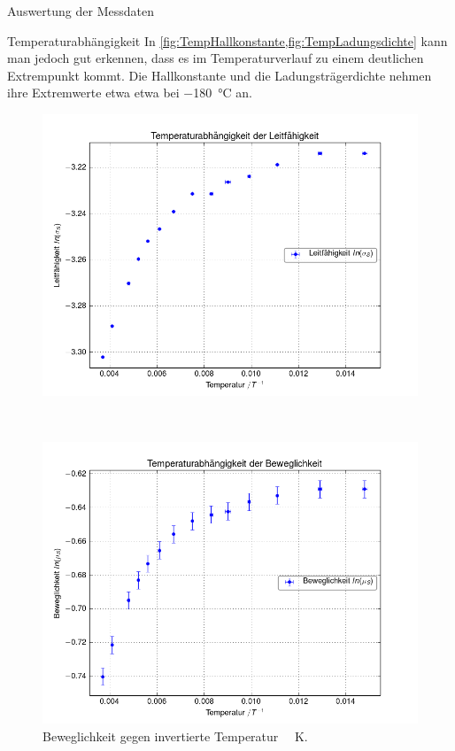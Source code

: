 \documentclass[pdftex, a4paper,11pt, twoside, ngerman]{report}
\begin{document}
\begin{chapter}{Auswertung der Messdaten}
\begin{section}{Temperaturabhängigkeit}
      In \cref{fig:TempHallkonstante,fig:TempLadungsdichte} kann man jedoch gut
      erkennen, dass es im Temperaturverlauf zu einem deutlichen Extrempunkt
      kommt.
      Die Hallkonstante und die Ladungsträgerdichte nehmen ihre Extremwerte etwa
      etwa bei \SI{-180}{\celsius} an.
      
      \begin{figure}[ht!]
        \centering
        \begin{minipage}{.92\textwidth}
          \centering
          \includegraphics[width=\textwidth]{Figures/Temp_Leitfaehigkeit.png}
          \caption{Leitfähigkeit gegen invertierte Temperatur
              \SI{}{\per\kelvin}.}
          \label{fig:TempLeifaehigkeit}
        \end{minipage}\\
        \begin{minipage}{.92\textwidth}
          \centering
          \includegraphics[width=\textwidth]{Figures/Temp_Beweglichkeit.png}
          \caption{Beweglichkeit gegen invertierte Temperatur
              \SI{}{\per\kelvin}.}
          \label{fig:TempBeweglichkeit}
        \end{minipage}
      \end{figure}
      

\end{section}
\end{chapter}
\end{document}
